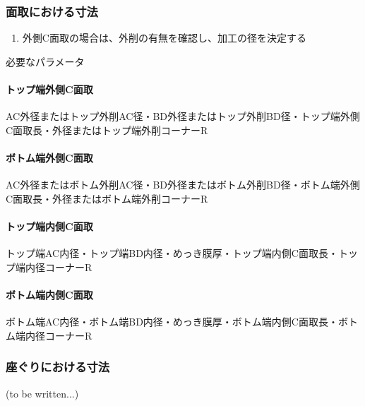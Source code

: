 \subsubsection{面取における寸法}
\begin{enumerate}
\item 外側C面取の場合は、外削の有無を確認し、加工の径を決定する
\end{enumerate}
\begin{Parameter}{必要なパラメータ}
\paragraph*{トップ端外側C面取}
AC外径またはトップ外削AC径・BD外径またはトップ外削BD径・トップ端外側C面取長・外径またはトップ端外削コーナーR
\tcbline*
\paragraph*{ボトム端外側C面取}
AC外径またはボトム外削AC径・BD外径またはボトム外削BD径・ボトム端外側C面取長・外径またはボトム端外削コーナーR
\tcbline*
\paragraph*{トップ端内側C面取}
トップ端AC内径・トップ端BD内径・めっき膜厚・トップ端内側C面取長・トップ端内径コーナーR
\tcbline*
\paragraph*{ボトム端内側C面取}
ボトム端AC内径・ボトム端BD内径・めっき膜厚・ボトム端内側C面取長・ボトム端内径コーナーR
\end{Parameter}

\clearpage
\subsubsection{座ぐりにおける寸法\TBW}
(to be written...)


